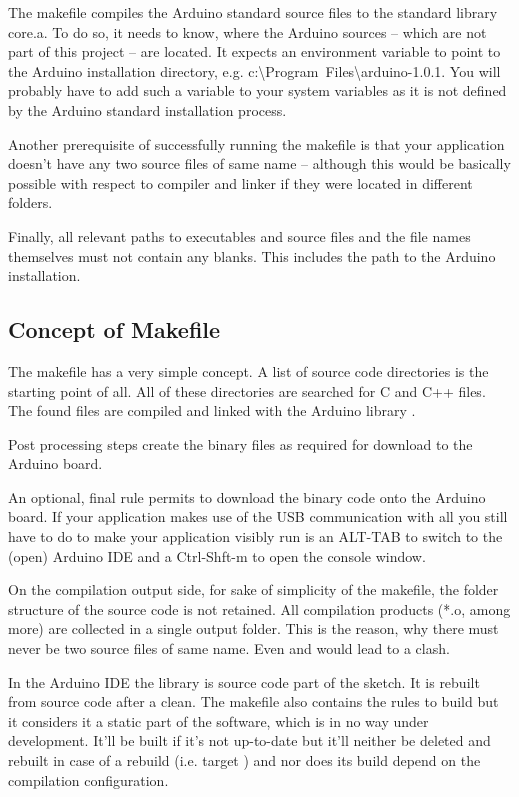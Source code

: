The makefile compiles the Arduino standard source files to the standard
library core.a. To do so, it needs to know, where the Arduino sources
-- which are not part of this project -- are located. It expects an
environment variable  to point to the Arduino
installation directory, e.g.
c:\textbackslash{}Program~Files\textbackslash\-arduino-1.0.1. You will
probably have to add such a variable to your system variables as it is not
defined by the Arduino standard installation process.

Another prerequisite of successfully running the makefile is that your
application doesn't have any two source files of same name -- although
this would be basically possible with respect to compiler and linker if
they were located in different folders.

Finally, all relevant paths to executables and source files and the file
names themselves must not contain any blanks. This includes the path to
the Arduino installation.

\subsection{Concept of Makefile}

The makefile has a very simple concept. A list of source code directories
is the starting point of all. All of these directories are searched for C
and C++ files. The found files are compiled and linked with the Arduino
library .

Post processing steps create the binary files as required for download to
the Arduino board.

An optional, final rule permits to download the binary code onto the
Arduino board. If your application makes use of the USB communication with
 all you still have to do to make your application visibly
run is an ALT-TAB to switch to the (open) Arduino IDE and a Ctrl-Shft-m to
open the console window.

On the compilation output side, for sake of simplicity of the makefile,
the folder structure of the source code is not retained. All compilation
products (*.o, among more) are collected in a single output folder. This
is the reason, why there must never be two source files of same name. Even
 and  would lead to a clash.

In the Arduino IDE the library  is source code part of the
sketch. It is rebuilt from source code after a clean. The \rtos{} makefile
also contains the rules to build  but it considers it a
static part of the software, which is in no way under development. It'll
be built if it's not up-to-date but it'll neither be deleted and rebuilt
in case of a rebuild (i.e. target ) and nor does its build
depend on the compilation configuration.

